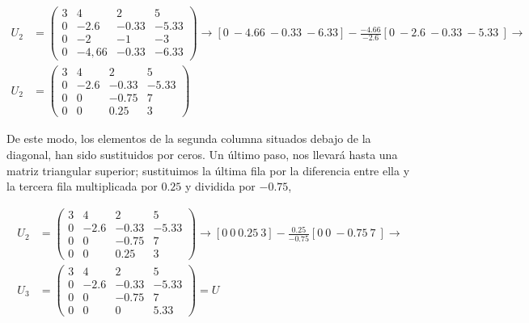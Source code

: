 \begin{align*}
U_2 &=\begin{pmatrix}
3& 4& 2&5\\
0& -2.6& -0.33& -5.33\\
0& -2& -1& -3\\
0& -4,66& -0.33& -6.33
\end{pmatrix} \rightarrow [0\ -4.66\ -0.33\ -6.33]-\frac{-4.66}{-2.6} [0\ -2.6\ -0.33\ -5.33\ ] \rightarrow \\
 U_2 &=\begin{pmatrix}
3& 4& 2&5\\
0& -2.6& -0.33& -5.33\\
0& 0& -0.75& 7\\
0& 0& 0.25& 3
\end{pmatrix}
\end{align*}

De este modo, los elementos de la segunda columna situados debajo de la diagonal, han sido sustituidos por ceros. Un último paso, nos llevará hasta una matriz triangular superior; sustituimos la última fila por la diferencia entre ella y la tercera fila multiplicada por $0.25$ y dividida por $-0.75$,

\begin{align*}
 U_2 &=\begin{pmatrix}
3& 4& 2&5\\
0& -2.6& -0.33& -5.33\\
0& 0& -0.75& 7\\
0& 0& 0.25& 3
\end{pmatrix} \rightarrow [0\ 0\ 0.25\ 3]-\frac{0.25}{-0.75} [0\ 0\ -0.75\ 7\ ] \rightarrow \\
 U_3 &=\begin{pmatrix}
3& 4& 2&5\\
0& -2.6& -0.33& -5.33\\
0& 0& -0.75& 7\\
0& 0& 0& 5.33
\end{pmatrix}=U
\end{align*}

